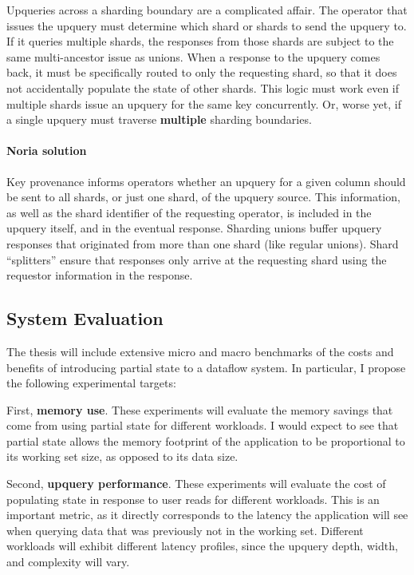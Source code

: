 \documentclass[12pt,letterpaper,twoside]{article}
\begin{document}
Upqueries across a sharding boundary are a complicated affair. The
operator that issues the upquery must determine which shard or shards to
send the upquery to. If it queries multiple shards, the responses from
those shards are subject to the same multi-ancestor issue as unions.
When a response to the upquery comes back, it must be specifically
routed to only the requesting shard, so that it does not accidentally
populate the state of other shards. This logic must work even if
multiple shards issue an upquery for the same key concurrently. Or,
worse yet, if a single upquery must traverse \textbf{multiple} sharding
boundaries.

\paragraph{Noria solution}
Key provenance informs operators whether an upquery for a given column should be
sent to all shards, or just one shard, of the upquery source. This information,
as well as the shard identifier of the requesting operator, is included in the
upquery itself, and in the eventual response. Sharding unions buffer upquery
responses that originated from more than one shard (like regular unions). Shard
``splitters'' ensure that responses only arrive at the requesting shard using
the requestor information in the response.

\subsection{System Evaluation}

The thesis will include extensive micro and macro benchmarks of the
costs and benefits of introducing partial state to a dataflow system. In
particular, I propose the following experimental targets:

First, \textbf{memory use}. These experiments will evaluate the memory
savings that come from using partial state for different workloads. I
would expect to see that partial state allows the memory footprint of
the application to be proportional to its working set size, as opposed
to its data size.

Second, \textbf{upquery performance}. These experiments will evaluate the
cost of populating state in response to user reads for different
workloads. This is an important metric, as it directly corresponds to
the latency the application will see when querying data that was
previously not in the working set. Different workloads will exhibit
different latency profiles, since the upquery depth, width, and
complexity will vary.
\end{document}
